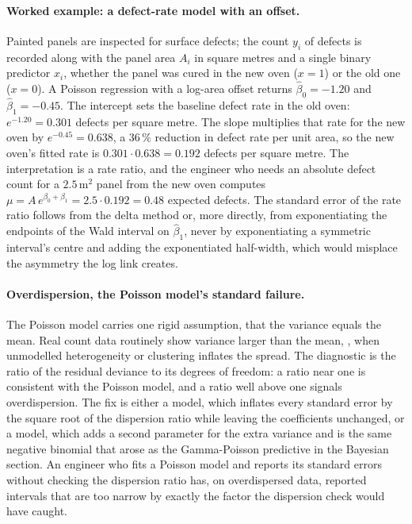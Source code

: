 \paragraph{Worked example: a defect-rate model with an offset.}
Painted panels are inspected for surface defects; the count $y_{i}$ of
defects is recorded along with the panel area $A_{i}$ in square metres
and a single binary predictor $x_{i}$, whether the panel was cured in
the new oven ($x = 1$) or the old one ($x = 0$). A Poisson regression
with a log-area offset returns $\hat{\beta}_{0} = -1.20$ and
$\hat{\beta}_{1} = -0.45$. The intercept sets the baseline defect rate
in the old oven: $e^{-1.20} = 0.301$ defects per square metre. The
slope multiplies that rate for the new oven by $e^{-0.45} = 0.638$, a
$36\,\%$ reduction in defect rate per unit area, so the new oven's
fitted rate is $0.301 \cdot 0.638 = 0.192$ defects per square metre.
The interpretation is a rate ratio, and the engineer who needs an
absolute defect count for a $2.5\,\si{\meter\squared}$ panel from the
new oven computes $\mu = A\, e^{\beta_{0} + \beta_{1}} = 2.5 \cdot
0.192 = 0.48$ expected defects. The standard error of the rate ratio
follows from the delta method or, more directly, from exponentiating
the endpoints of the Wald interval on $\hat{\beta}_{1}$, never by
exponentiating a symmetric interval's centre and adding the
exponentiated half-width, which would misplace the asymmetry the log
link creates.

\paragraph{Overdispersion, the Poisson model's standard failure.}
The Poisson model carries one rigid assumption, that the variance
equals the mean. Real count data routinely show variance larger than
the mean, , when unmodelled heterogeneity or
clustering inflates the spread. The diagnostic is the ratio of the
residual deviance to its degrees of freedom: a ratio near one is
consistent with the Poisson model, and a ratio well above one signals
overdispersion. The fix is either a  model,
which inflates every standard error by the square root of the
dispersion ratio while leaving the coefficients unchanged, or a
 model, which adds a second parameter for
the extra variance and is the same negative binomial that arose as the
Gamma-Poisson predictive in the Bayesian section. An engineer who fits
a Poisson model and reports its standard errors without checking the
dispersion ratio has, on overdispersed data, reported intervals that
are too narrow by exactly the factor the dispersion check would have
caught.

